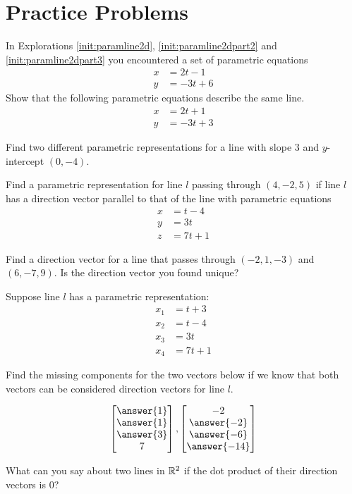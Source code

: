 \documentclass{ximera}
\begin{document}
\section*{Practice Problems}

\begin{problem}\label{prob:paramnotunique}
In Explorations \ref{init:paramline2d}, \ref{init:paramline2dpart2} and \ref{init:paramline2dpart3} you encountered a set of parametric equations
\begin{align*}
x&=2t-1\\
y&=-3t+6
\end{align*}
Show that the following parametric equations describe the same line.
\begin{align*}
x&=2t+1\\
y&=-3t+3
\end{align*}
\end{problem}

\begin{problem}\label{prob:paramnotunique2}
Find two different parametric representations for a line with slope $3$ and $y$-intercept $(0, -4)$.
\end{problem}

\begin{problem}\label{prob:parameqpointparalline}
Find a parametric representation for line $l$ passing through $(4, -2, 5)$ if line $l$ has a direction vector parallel to that of the line with parametric equations 
\begin{align*}
x&=t-4\\
y&=3t\\
z&=7t+1
\end{align*}
\end{problem}

\begin{problem}\label{prob:directionvect} Find a direction vector for a line that passes through $(-2, 1, -3)$ and $(6, -7, 9)$.  Is the direction vector you found unique?
\end{problem}

\begin{problem}\label{prob:directionvect2}
Suppose line $l$ has a parametric representation:
\begin{align*}
x_1&=t+3\\
x_2&=t-4\\
x_3&=3t\\
x_4&=7t+1
\end{align*}

Find the missing components for the two vectors below if we know that both vectors can be considered  direction vectors for line $l$.

$$\begin{bmatrix}\answer{1}\\\answer{1}\\\answer{3}\\7\end{bmatrix},\begin{bmatrix}-2\\\answer{-2}\\\answer{-6}\\\answer{-14}\end{bmatrix}$$
\end{problem}

\begin{problem}\label{prob:dotproductdirvect}
What can you say about two lines in $\mathbb{R}^2$ if the dot product of their direction vectors is $0$?
\end{problem}
\end{document}
